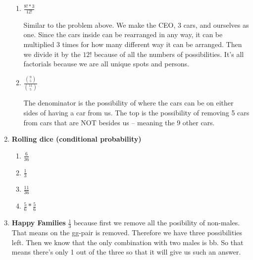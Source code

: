 \documentclass[12pt,fleqn]{article}
\begin{document}
\begin{enumerate}
\begin{enumerate}
    \item 
	$\frac{8! * 3}{12!}$
    
    Similar to the problem above. We make the CEO, 3 cars, and ourselves as one. Since the cars inside can be rearranged in any way, it can be multiplied 3 times for how many different way it can be arranged. Then we divide it by the $12!$ because of all the numbers of possibilities. It's all factorials because we are all unique spots and persons. 
    
    \item 
    $\frac{{9 \choose 5}}{{11 \choose 5}}$
    
    The denominator is the possibility of where the cars can be on either sides of having a car from us. The top is the possibility of removing 5 cars from cars that are NOT besides us -- meaning the 9 other cars. 
      
  \end{enumerate}
  
  
  \newpage
  \item \textbf{Rolling dice (conditional probability)}
  
  \begin{enumerate}
    \item 
    $\frac{6}{36}$
    
    \item 
    $\frac{1}{3}$
    
    \item 
    $\frac{11}{36}$
    
    \item 
    $\frac{5}{6} * \frac{5}{6}$
      
  \end{enumerate}
  
  
  \newpage
  \item \textbf{Happy Families}
 	$\frac{1}{3}$ because first we remove all the posibility of non-males. That means on the gg-pair is removed. Therefore we have three possibilities left. Then we know that the only combination with two males is bb. So that means there's only 1 out of the three so that it will give us such an answer.


\end{enumerate}
\end{document}
